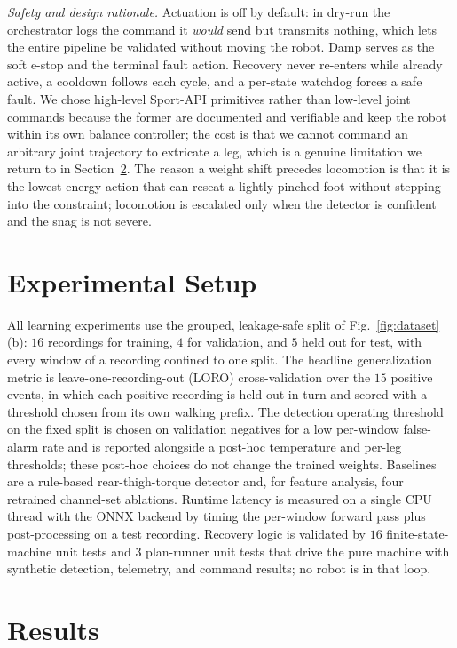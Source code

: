 \documentclass[conference]{IEEEtran}
\begin{document}
\emph{Safety and design rationale.} Actuation is off by default: in dry-run the
orchestrator logs the command it \emph{would} send but transmits nothing, which lets
the entire pipeline be validated without moving the robot. Damp serves as the soft
e-stop and the terminal fault action. Recovery never re-enters while already active,
a cooldown follows each cycle, and a per-state watchdog forces a safe fault. We chose
high-level Sport-API primitives rather than low-level joint commands because the
former are documented and verifiable and keep the robot within its own balance
controller; the cost is that we cannot command an arbitrary joint trajectory to
extricate a leg, which is a genuine limitation we return to in
Section~\ref{sec:results}. The reason a weight shift precedes locomotion is that it is
the lowest-energy action that can reseat a lightly pinched foot without stepping into
the constraint; locomotion is escalated only when the detector is confident and the
snag is not severe.

\section{Experimental Setup}
\label{sec:setup}
All learning experiments use the grouped, leakage-safe split of
Fig.~\ref{fig:dataset}(b): $16$ recordings for training, $4$ for validation, and $5$
held out for test, with every window of a recording confined to one split. The
headline generalization metric is leave-one-recording-out (LORO) cross-validation
over the $15$ positive events, in which each positive recording is held out in turn
and scored with a threshold chosen from its own walking prefix. The detection
operating threshold on the fixed split is chosen on validation negatives for a low
per-window false-alarm rate and is reported alongside a post-hoc temperature and
per-leg thresholds; these post-hoc choices do not change the trained weights.
Baselines are a rule-based rear-thigh-torque detector and, for feature analysis, four
retrained channel-set ablations. Runtime latency is measured on a single CPU thread
with the ONNX backend by timing the per-window forward pass plus post-processing on a
test recording. Recovery logic is validated by $16$ finite-state-machine unit tests
and $3$ plan-runner unit tests that drive the pure machine with synthetic detection,
telemetry, and command results; no robot is in that loop.

\section{Results}
\label{sec:results}
\end{document}
